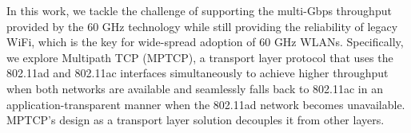 In this work, we tackle the challenge of supporting the multi-Gbps
throughput provided by the 60 GHz technology while still providing
the reliability of legacy WiFi, which is the key for wide-spread adoption of 60 GHz WLANs.
Specifically, we explore Multipath TCP (MPTCP), a
transport layer protocol that uses the 802.11ad and 802.11ac interfaces simultaneously to 
achieve higher throughput when both networks are available and seamlessly falls back to 
802.11ac in an application-transparent manner when the 802.11ad network becomes unavailable. 
MPTCP's design as a transport layer solution
decouples it from other layers.
\begin{comment}
In contrast, solutions that try to achieve
a similar functionality at the MAC or lower layers, such as 802.11ad's
Fast Session Transfer (FST)~\cite{80211ad}, are invariably tied to the
802.11 specifications and hence are not future proof. More
importantly, MPTCP by design provides the same guarantees to
applications as single-path TCP (SPTCP) in terms of packet delivery and
includes mechanisms to deal with issues such as packet re-ordering
among different interfaces that would otherwise need to be
addressed by any solution implemented at lower layers of the stack,
thus avoiding an unnecessary duplication of functionality.
\end{comment}

